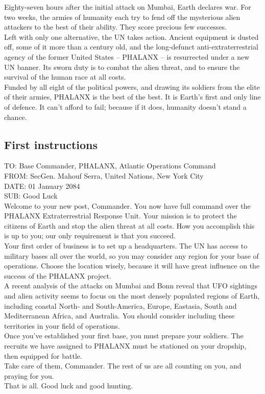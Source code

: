 Eighty-seven hours after the initial attack on Mumbai, Earth declares war. For two weeks, the armies of humanity each try to fend off the mysterious alien attackers to the best of their ability. They score precious few successes.\\
Left with only one alternative, the UN takes action. Ancient equipment is dusted off, some of it more than a century old, and the long-defunct anti-extraterrestrial agency of the former United States -- PHALANX -- is resurrected under a new UN banner. Its sworn duty is to combat the alien threat, and to ensure the survival of the human race at all costs.\\
Funded by all eight of the political powers, and drawing its soldiers from the elite of their armies, PHALANX is the best of the best. It is Earth's first and only line of defence. It can't afford to fail; because if it does, humanity doesn't stand a chance. 

\subsection{First instructions}
TO: Base Commander, PHALANX, Atlantic Operations Command\\
FROM: SecGen. Mahouf Serra, United Nations, New York City\\
DATE: 01 January 2084\\
SUB: Good Luck\\
Welcome to your new post, Commander. You now have full command over the PHALANX Extraterrestrial Response Unit. Your mission is to protect the citizens of Earth and stop the alien threat at all costs. How you accomplish this is up to you; our only requirement is that you succeed.\\
Your first order of business is to set up a headquarters. The UN has access to military bases all over the world, so you may consider any region for your base of operations. Choose the location wisely, because it will have great influence on the success of the PHALANX project.\\
A recent analysis of the attacks on Mumbai and Bonn reveal that UFO sightings and alien activity seems to focus on the most densely populated regions of Earth, including coastal North- and South-America, Europe, Eastasia, South and Mediterranean Africa, and Australia. You should consider including these territories in your field of operations.\\
Once you've established your first base, you must prepare your soldiers. The recruits we have assigned to PHALANX must be stationed on your dropship, then equipped for battle.\\
Take care of them, Commander. The rest of us are all counting on you, and praying for you.\\
That is all. Good luck and good hunting. \\
